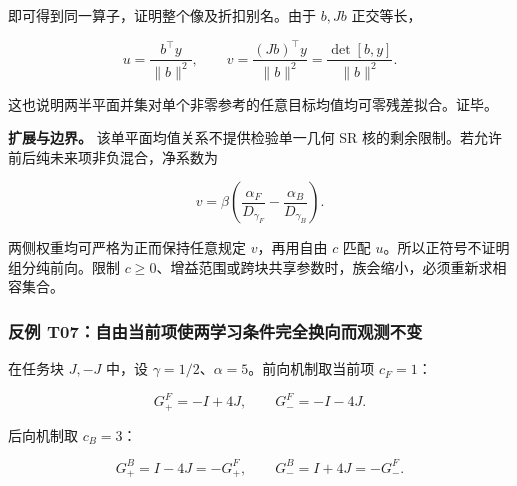 \documentclass[11pt,a4paper]{article}
\begin{document}
\par
\noindent\begin{minipage}{\linewidth}

即可得到同一算子，证明整个像及折扣别名。由于 \(b,Jb\) 正交等长，

\[
u=\frac{b^\top y}{\|b\|^2},\qquad
v=\frac{(Jb)^\top y}{\|b\|^2}
=\frac{\det[b,y]}{\|b\|^2}.
\]

\end{minipage}\par

这也说明两半平面并集对单个非零参考的任意目标均值均可零残差拟合。证毕。

\par
\noindent\begin{minipage}{\linewidth}

\textbf{扩展与边界。} 该单平面均值关系不提供检验单一几何 SR
核的剩余限制。若允许前后纯未来项非负混合，净系数为

\[
v=\beta\left(\frac{\alpha_F}{D_{\gamma_F}}-
\frac{\alpha_B}{D_{\gamma_B}}\right).
\]

\end{minipage}\par

两侧权重均可严格为正而保持任意规定 \(v\)，再用自由 \(c\) 匹配
\(u\)。所以正符号不证明组分纯前向。限制
\(c\ge0\)、增益范围或跨块共享参数时，族会缩小，必须重新求相容集合。

\subsubsection{反例
T07：自由当前项使两学习条件完全换向而观测不变}\label{ux53cdux4f8b-t07ux81eaux7531ux5f53ux524dux9879ux4f7fux4e24ux5b66ux4e60ux6761ux4ef6ux5b8cux5168ux6362ux5411ux800cux89c2ux6d4bux4e0dux53d8}

\par
\noindent\begin{minipage}{\linewidth}

在任务块 \(J,-J\) 中，设 \(\gamma=1/2\)、\(\alpha=5\)。前向机制取当前项
\(c_F=1\)：

\[
G^F_+=-I+4J,\qquad G^F_-=-I-4J.
\]

\end{minipage}\par

\par
\noindent\begin{minipage}{\linewidth}

后向机制取 \(c_B=3\)：

\[
G^B_+=I-4J=-G^F_+,\qquad
G^B_-=I+4J=-G^F_-.
\]

\end{minipage}\par
\end{document}
